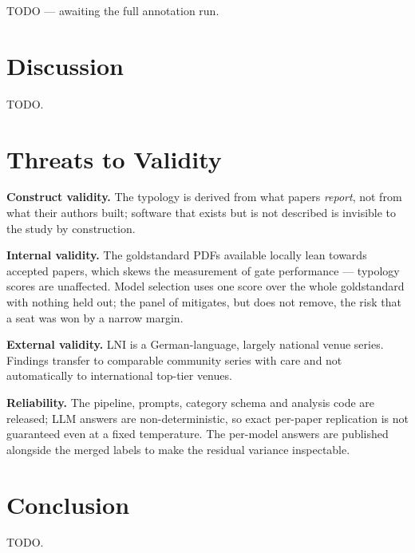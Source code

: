 \documentclass[
        pdflatex,sn-basic,lineno
    ]{sn-jnl}
\begin{document}
    TODO --- awaiting the full annotation run.

    \section{Discussion}\label{discussion}

    TODO.

    \section{Threats to Validity}\label{threats-to-validity}

    \textbf{Construct validity.} The typology is derived from what
    papers \emph{report}, not from what their authors built; software
    that exists but is not described is invisible to the study by
    construction.

    \textbf{Internal validity.} The goldstandard PDFs available locally
    lean towards accepted papers, which skews the measurement of gate
    performance --- typology scores are unaffected. Model selection uses
    one score over the whole goldstandard with nothing held out; the
    panel of \PanelSize mitigates, but does not remove, the risk that a
    seat was won by a narrow margin.

    \textbf{External validity.} LNI is a German-language, largely
    national venue series. Findings transfer to comparable community
    series with care and not automatically to international top-tier
    venues.

    \textbf{Reliability.} The pipeline, prompts, category schema and
    analysis code are released; LLM answers are non-deterministic, so
    exact per-paper replication is not guaranteed even at a fixed
    temperature. The per-model answers are published alongside the
    merged labels to make the residual variance inspectable.

    \section{Conclusion}\label{conclusion}

    TODO.

    \backmatter

            
    
        
    
\end{document}
